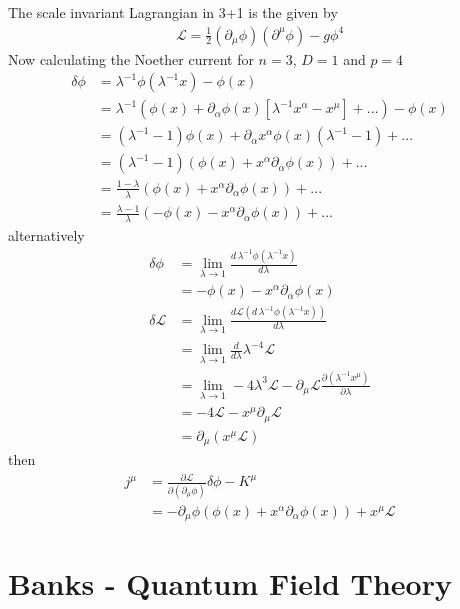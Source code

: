 \documentclass[10pt,a4paper]{book}
\theoremstyle{definition}
\begin{document}
The scale invariant Lagrangian in 3+1 is the given by
\begin{align}
\mathcal{L}=\frac{1}{2}(\partial_\mu\phi)(\partial^\mu\phi)-g\phi^4
\end{align} 
Now calculating the Noether current for $n=3$, $D=1$ and $p=4$
\begin{align}
\delta\phi&=\lambda^{-1}\phi(\lambda^{-1}x)-\phi(x)\\
&=\lambda^{-1}\left(\phi(x)+\partial_\alpha\phi(x)[\lambda^{-1}x^\alpha-x^\mu]+...\right)-\phi(x)\\
&=(\lambda^{-1}-1)\phi(x)+\partial_\alpha x^\alpha\phi(x)(\lambda^{-1}-1)+...\\
&=(\lambda^{-1}-1)(\phi(x)+x^\alpha\partial_\alpha\phi(x))+...\\
&=\frac{1-\lambda}{\lambda}(\phi(x)+x^\alpha\partial_\alpha\phi(x))+...\\
&=\frac{\lambda-1}{\lambda}(-\phi(x)-x^\alpha\partial_\alpha\phi(x))+...
\end{align}
alternatively
\begin{align}
\delta\phi&=\lim_{\lambda\rightarrow1}\frac{d\, \lambda^{-1}\phi(\lambda^{-1}x)}{d\lambda}\\
&=-\phi(x)-x^\alpha\partial_\alpha\phi(x)\\
\delta\mathcal{L}
&=\lim_{\lambda\rightarrow1}\frac{d\mathcal{L}(d\, \lambda^{-1}\phi(\lambda^{-1}x))}{d\lambda}\\
&=\lim_{\lambda\rightarrow1}\frac{d}{d\lambda}\lambda^{-4}\mathcal{L}\\
&=\lim_{\lambda\rightarrow1}-4\lambda^3\mathcal{L}-\partial_\mu\mathcal{L}\frac{\partial(\lambda^{-1}x^\mu)}{\partial\lambda}\\
&=-4\mathcal{L}-x^\mu\partial_\mu\mathcal{L}\\
&=\partial_\mu(x^\mu\mathcal{L})
\end{align}
then
\begin{align}
j^\mu&=\frac{\partial\mathcal{L}}{\partial(\partial_\mu\phi)}\delta\phi-K^\mu\\
&=-\partial_\mu\phi (\phi(x)+x^\alpha\partial_\alpha\phi(x))+x^\mu\mathcal{L}
\end{align}

\newpage
\section{{\sc Banks} - Quantum Field Theory}
\end{document}
